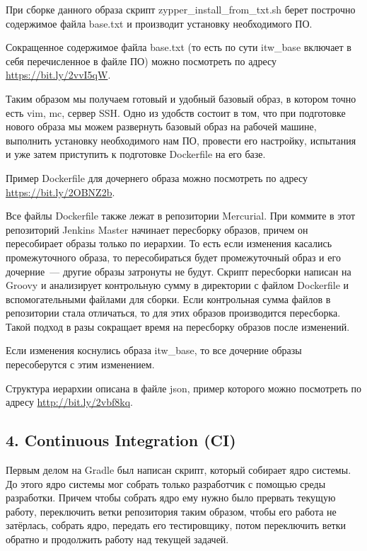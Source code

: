 \documentclass[10pt, a5paper]{article}
\begin{document}
При сборке данного образа скрипт zypper\_install\_from\_txt.sh берет построчно содержимое файла base.txt и производит установку необходимого ПО.

Сокращенное содержимое файла base.txt (то есть по сути itw\_base включает в себя перечисленное в файле ПО) можно посмотреть по адресу \url{https://bit.ly/2vvI5qW}.

Таким образом мы получаем готовый и удобный базовый образ, в котором точно есть vim, mc, сервер SSH. Одно из удобств состоит в том, что при подготовке нового образа мы можем развернуть базовый образ на рабочей машине, выполнить установку необходимого нам ПО, провести его настройку, испытания и уже затем приступить к подготовке Dockerfile на его базе.

Пример Dockerfile для дочернего образа можно посмотреть по адресу \url{https://bit.ly/2OBNZ2b}.

Все файлы Dockerfile также лежат в репозитории Mercurial. При коммите в этот репозиторий Jenkins Master начинает пересборку образов, причем он пересобирает образы только по иерархии. То есть если изменения касались промежуточного образа, то пересобираться будет промежуточный образ и его дочерние~--- другие образы затронуты не будут. Скрипт пересборки написан на Groovy и анализирует контрольную сумму в директории с файлом Dockerfile и вспомогательными файлами для сборки. Если контрольная сумма файлов в репозитории стала отличаться, то для этих образов производится пересборка. Такой подход в разы сокращает время на пересборку образов после изменений.

Если изменения коснулись образа itw\_base, то все дочерние образы пересоберутся с этим изменением.

Структура иерархии описана в файле json, пример которого можно посмотреть по адресу \url{http://bit.ly/2vbf8kq}.

\subsection*{4. Continuous Integration (CI)}

Первым делом на Gradle был написан скрипт, который собирает ядро системы. До этого ядро системы мог собрать только разработчик с помощью среды разработки. Причем чтобы собрать ядро ему нужно было прервать текущую работу,  переключить ветки репозитория таким образом, чтобы его работа не затёрлась, собрать ядро, передать его тестировщику, потом переключить ветки обратно и продолжить работу над текущей задачей.
\end{document}
